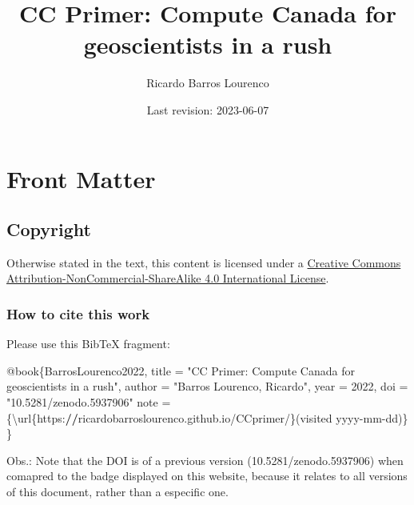 \documentclass[
]{book}
\title{CC Primer: Compute Canada for geoscientists in a rush}
\author{Ricardo Barros Lourenco}
\date{Last revision: 2023-06-07}
\newenvironment{Shaded}{\begin{snugshade}}{\end{snugshade}}
\newcommand{\DecValTok}[1]{\textcolor[rgb]{0.00,0.00,0.81}{#1}}
\newcommand{\ErrorTok}[1]{\textcolor[rgb]{0.64,0.00,0.00}{\textbf{#1}}}
\newcommand{\NormalTok}[1]{#1}
\newcommand{\OtherTok}[1]{\textcolor[rgb]{0.56,0.35,0.01}{#1}}
\newcommand{\SpecialCharTok}[1]{\textcolor[rgb]{0.00,0.00,0.00}{#1}}
\newcommand{\StringTok}[1]{\textcolor[rgb]{0.31,0.60,0.02}{#1}}
\begin{document}
\maketitle

{
\setcounter{tocdepth}{1}
\tableofcontents
}
\hypertarget{front-matter}{%
\chapter{Front Matter}\label{front-matter}}

\hypertarget{copyright}{%
\section{Copyright}\label{copyright}}

Otherwise stated in the text, this content is licensed under a \href{http://creativecommons.org/licenses/by-nc-sa/4.0/}{Creative Commons Attribution-NonCommercial-ShareAlike 4.0 International License}.

\hypertarget{how-to-cite-this-work}{%
\subsection{How to cite this work}\label{how-to-cite-this-work}}

Please use this BibTeX fragment:

\begin{Shaded}
\begin{Highlighting}[]
\SpecialCharTok{@}\NormalTok{book\{BarrosLourenco2022,}
\NormalTok{  title     }\OtherTok{=} \StringTok{"CC Primer: Compute Canada for geoscientists in a rush"}\NormalTok{,}
\NormalTok{  author    }\OtherTok{=} \StringTok{"Barros Lourenco, Ricardo"}\NormalTok{,}
\NormalTok{  year      }\OtherTok{=} \DecValTok{2022}\NormalTok{,}
\NormalTok{  doi       }\OtherTok{=} \StringTok{"10.5281/zenodo.5937906"}
\NormalTok{  note      }\OtherTok{=}\NormalTok{ \{\textbackslash{}url\{https}\SpecialCharTok{:}\ErrorTok{//}\NormalTok{ricardobarroslourenco.github.io}\SpecialCharTok{/}\NormalTok{CCprimer}\SpecialCharTok{/}\NormalTok{\}(visited yyyy}\SpecialCharTok{{-}}\NormalTok{mm}\SpecialCharTok{{-}}\NormalTok{dd)\}}
\NormalTok{\}}
\end{Highlighting}
\end{Shaded}

Obs.: Note that the DOI is of a previous version (10.5281/zenodo.5937906) when
comapred to the badge displayed on this website, because it relates to all versions
of this document, rather than a especific one.
\end{document}
